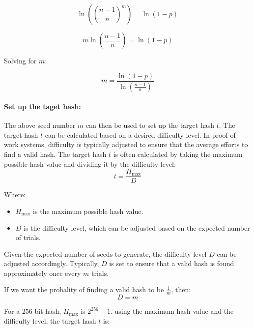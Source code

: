 \documentclass[runningheads]{llncs}
\begin{document}
\[
\ln\left(\left(\frac{n-1}{n}\right)^m\right) = \ln(1 - p)
\]

\[
m \ln\left(\frac{n-1}{n}\right) = \ln(1 - p)
\]

Solving for \( m \):

\[
m = \frac{\ln(1 - p)}{\ln\left(\frac{n-1}{n}\right)}
\]







\paragraph{Set up the taget hash:}
The above seed number $m$ can then be used to set up the target hash $t$. The target hash $t$ can be calculated based on a desired difficulty level. In proof-of-work systems, difficulty is typically adjusted to ensure that the average efforts to find a valid hash. The target hash $t$ is often calculated by taking the maximum possible hash value and dividing it by the difficulty level:
\[
t = \frac{H_{\text{max}}}{D}
\]

Where:
\begin{itemize}
  \item \( H_{\text{max}} \) is the maximum possible hash value.
  \item \( D \) is the difficulty level, which can be adjusted based on the expected number of trials.
\end{itemize}


Given the expected number of seeds to generate, 
the difficulty level $D$ can be adjusted accordingly. Typically, $D$ is set to ensure that a valid hash is found approximately once every $m$ trials.

If we want the probality of finding a valid hash to be $\frac{1}{m}$, then:
\[
D=m
\]

For a 256-bit hash, $H_{\text{max}}$ is $2^{256} - 1 $.  using the maximum hash value and the difficulty level, the target hash $t$ is:
    
\end{document}

